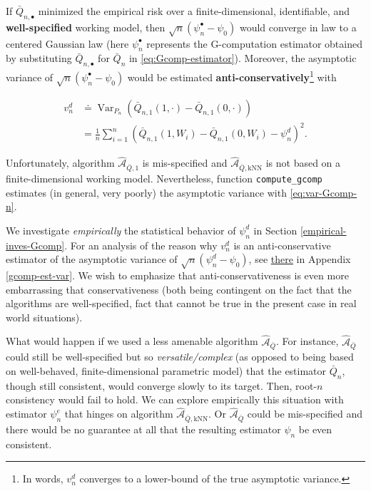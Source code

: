 \documentclass[
  11pt,
  openright,twoside]{book}
\DeclareMathOperator{\Var}{Var}
\newcommand{\Algo}{\widehat{\mathcal{A}}}
\newcommand{\defq}{\doteq}
\newcommand{\Qbar}{\bar{Q}}
\theoremstyle{definition}
\theoremstyle{definition}
\theoremstyle{definition}
\theoremstyle{definition}
\theoremstyle{remark}
\begin{document}
If \(\Qbar_{n,\bullet}\) minimized the empirical risk over a
finite-dimensional, identifiable, and \textbf{well-specified} working model, then
\(\sqrt{n} (\psi_{n}^{\bullet} - \psi_{0})\) would converge in law to a
centered Gaussian law (here \(\psi_{n}^{\bullet}\) represents the G-computation
estimator obtained by substituting \(\Qbar_{n,\bullet}\) for \(\Qbar_{n}\) in
\eqref{eq:Gcomp-estimator}). Moreover, the asymptotic
variance of \(\sqrt{n} (\psi_{n}^{\bullet} - \psi_{0})\) would be estimated
\textbf{anti-conservatively}\footnote{In words, \(v_{n}^{d}\) converges to a lower-bound of
  the true asymptotic variance.} with

\begin{align} 
v_{n}^{d}            &\defq            \Var_{P_{n}}
\left(\Qbar_{n,1}(1,\cdot) - \Qbar_{n,1}(0,\cdot)\right) \\ &= \frac{1}{n}
\sum_{i=1}^{n}\left(\Qbar_{n,1}(1,W_{i})         -        \Qbar_{n,1}(0,W_{i})
-\psi_{n}^{d}\right)^{2}.  \label{eq:var-Gcomp-n} 
\end{align}

Unfortunately, algorithm \(\Algo_{\Qbar,1}\) is mis-specified and
\(\Algo_{\Qbar,\text{kNN}}\) is not based on a finite-dimensional working
model. Nevertheless, function \texttt{compute\_gcomp} estimates (in general, very
poorly) the asymptotic variance with \eqref{eq:var-Gcomp-n}.

We investigate \emph{empirically} the statistical behavior of \(\psi_{n}^{d}\) in
Section \ref{empirical-inves-Gcomp}. For an analysis of the reason why
\(v_{n}^{d}\) is an anti-conservative estimator of the asymptotic variance of
\(\sqrt{n} (\psi_{n}^{d} - \psi_{0})\), see \protect\hyperlink{gcomp-est-var}{there} in Appendix
\ref{gcomp-est-var}. We wish to emphasize that anti-conservativeness is even
more embarrassing that conservativeness (both being contingent on the fact
that the algorithms are well-specified, fact that cannot be true in the
present case in real world situations).

What would happen if we used a less amenable algorithm \(\Algo_{\Qbar}\). For
instance, \(\Algo_{\Qbar}\) could still be well-specified but so
\emph{versatile/complex} (as opposed to being based on well-behaved,
finite-dimensional parametric model) that the estimator \(\Qbar_{n}\), though
still consistent, would converge slowly to its target. Then, root-\(n\)
consistency would fail to hold. We can explore empirically this situation
with estimator \(\psi_{n}^{e}\) that hinges on algorithm
\(\Algo_{\Qbar,\text{kNN}}\). Or \(\Algo_{\Qbar}\) could be
mis-specified and there would be no guarantee at all
that the resulting estimator \(\psi_{n}\) be even consistent.
\end{document}
